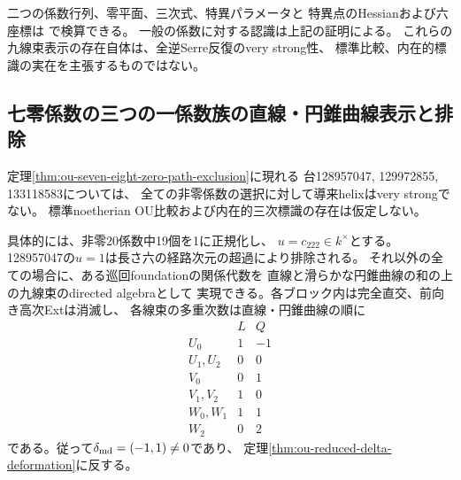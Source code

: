 \begin{remark}
二つの係数行列、零平面、三次式、特異パラメータと
特異点のHessianおよび六座標は
で検算できる。
一般の係数に対する認識は上記の証明による。
これらの九線束表示の存在自体は、全逆Serre反復のvery strong性、
標準比較、内在的標識の実在を主張するものではない。
\end{remark}

\subsection{七零係数の三つの一係数族の直線・円錐曲線表示と排除}
\label{subsec:ou-seven-zero-line-conics}

\begin{theorem}[直線・円錐曲線表示による多重次数障害]
\label{thm:ou-seven-zero-line-conic-exclusion}
定理\ref{thm:ou-seven-eight-zero-path-exclusion}に現れる
台128957047, 129972855, 133118583については、
全ての非零係数の選択に対して導来helixはvery strongでない。
標準noetherian OU比較および内在的三次標識の存在は仮定しない。

具体的には、非零20係数中19個を1に正規化し、
$u=c_{222}\in k^\times$とする。
128957047の$u=1$は長さ六の経路次元の超過により排除される。
それ以外の全ての場合に、ある巡回foundationの関係代数を
直線と滑らかな円錐曲線の和の上の九線束のdirected algebraとして
実現できる。各ブロック内は完全直交、前向き高次Extは消滅し、
各線束の多重次数は直線・円錐曲線の順に
\[
\begin{array}{c|rr}
 &L&Q\\ \hline
 U_0&1&-1\\
 U_1,U_2&0&0\\
 V_0&0&1\\
 V_1,V_2&1&0\\
 W_0,W_1&1&1\\
 W_2&0&2
\end{array}
\]
である。従って$\delta_{\rm md}=(-1,1)\ne0$であり、
定理\ref{thm:ou-reduced-delta-deformation}に反する。
\end{theorem}

